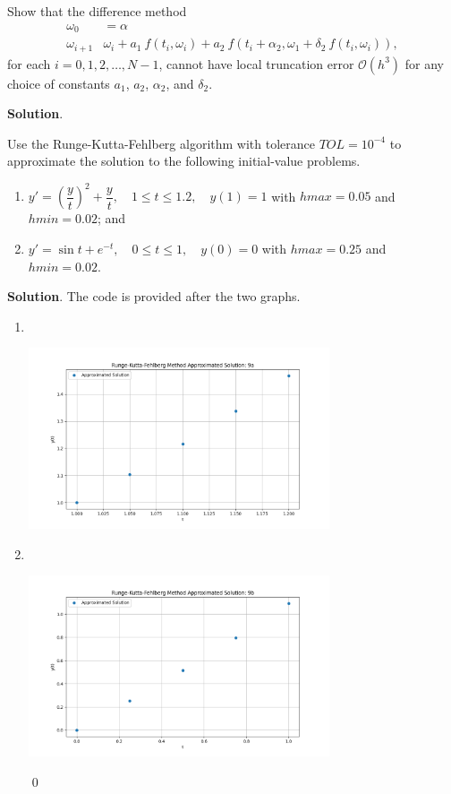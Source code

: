 \documentclass[11pt]{article}
\theoremstyle{break}
\numberwithin{equation}{theorem}
\begin{document}
\newpage
\begin{problem}\label{problem 8} %
    Show that the difference method 
    \begin{align*}
        \omega_0&=\alpha\\
        \omega_{i+1}&\omega_i+a_1\:f(t_i, \omega_i)+a_2\:f(t_i+\alpha_2, \omega_1+\delta_2\:f(t_i, \omega_i)),
    \end{align*}
    for each $i=0,1,2,\dots, N-1$, cannot have local truncation error $\mathcal{O}(h^3)$ for any choice of constants $a_1$, $a_2$, $\alpha_2$, and $\delta_2$.
\end{problem}
\textbf{Solution}. 


\newpage
\begin{problem}\label{problem 9} %
    Use the Runge-Kutta-Fehlberg algorithm with tolerance $TOL = 10^{-4}$ to approximate the solution to the following initial-value problems.
    \begin{enumerate}
        \item $y'=\left(\dfrac{y}{t}\right)^2+\dfrac{y}{t}, \quad 1\leq t\leq 1.2, \quad y(1)=1$ with $hmax=0.05$ and $hmin=0.02$; and
        \item $y'=\sin t+e^{-t}, \quad 0\leq t\leq 1, \quad y(0)=0$ with $hmax=0.25$ and $hmin=0.02.$
    \end{enumerate}
\end{problem}
\textbf{Solution}. The code is provided after the two graphs.
\begin{enumerate}
    \item $\ $
    \begin{center}
        \includegraphics[width=0.7\textwidth]{P9a.png}
    \end{center}
    \item $\ $
    \begin{center}
        \includegraphics[width=0.7\textwidth]{P9b.png}
    \end{center} \qed
\end{enumerate}
\end{document}

